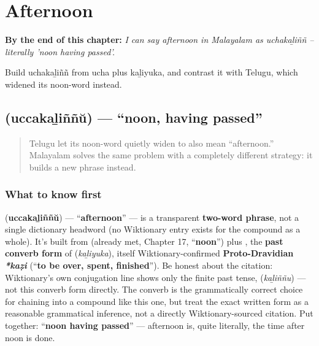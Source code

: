 
\chapter{Afternoon}
\label{ch:ml-afternoon}

\begin{chapteropening}
\textbf{By the end of this chapter:} \emph{I can say afternoon in Malayalam as uchakaḻiññ -- literally 'noon having passed'.}

Build uchakaḻiññ from ucha plus kaḻiyuka, and contrast it with Telugu, which widened its noon-word instead.
\end{chapteropening}

\section[\texorpdfstring{\ml{ഉച്ചകഴിഞ്ഞ്} (uccakaḻiññŭ)}{ഉച്ചകഴിഞ്ഞ് (uccakaḻiññŭ)}]{ (uccakaḻiññŭ) — \textquotedblleft{}noon, having passed\textquotedblright{}}

\label{lesson:ML-C28-uchakazhinju}



\begin{quote}
Telugu let its noon-word quietly widen to also mean \textquotedblleft{}afternoon.\textquotedblright{} Malayalam solves the same problem with a completely different strategy: it builds a new phrase instead.
\end{quote}

\subsection*{What to know first}
\textbf{} (\textbf{uccakaḻiññŭ}) — \textquotedblleft{}\textbf{afternoon}\textquotedblright{} — is a transparent \textbf{two-word phrase}, not a single dictionary headword (no Wiktionary entry exists for the compound as a whole). It's built from \textbf{} (already met, Chapter 17, \textquotedblleft{}\textbf{noon}\textquotedblright{}) plus \textbf{}, the \textbf{past converb form} of \textbf{} (\emph{kaḻiyuka}), itself Wiktionary-confirmed \textbf{Proto-Dravidian} \emph{\textbf{*kaẓi}} (\textquotedblleft{}\textbf{to be over, spent, finished}\textquotedblright{}). Be honest about the citation: Wiktionary's own conjugation line shows only the finite past tense, \textbf{} (\emph{kaḻiññu}) — not this converb form directly. The converb is the grammatically correct choice for chaining into a compound like this one, but treat the exact written form as a reasonable grammatical inference, not a directly Wiktionary-sourced citation. Put together: \textquotedblleft{}\textbf{noon having passed}\textquotedblright{} — afternoon is, quite literally, the time after noon is done.

